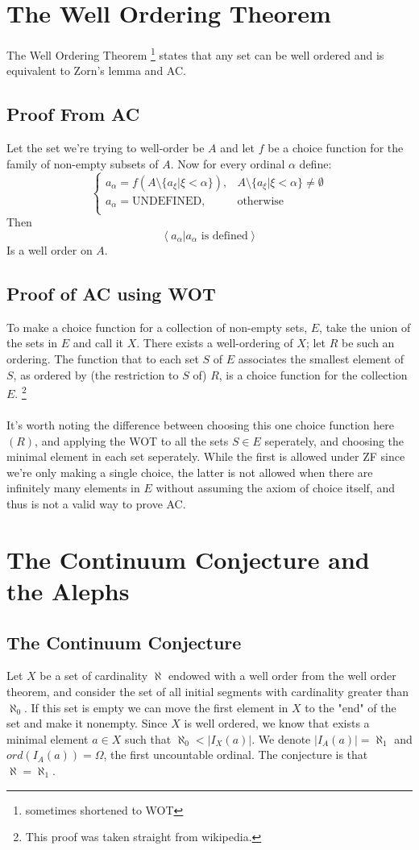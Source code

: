 \documentclass{article}
\theoremstyle{plain}
\begin{document}
\newpage
\section{The Well Ordering Theorem}
The Well Ordering Theorem
\footnote{sometimes shortened to WOT} states that any set can be well ordered 
and is equivalent to Zorn's lemma and AC.
\subsection{Proof From AC}
Let the set we're trying to well-order be $A$ and let $f$ be a choice 
function for the family of non-empty subsets of $A$. Now for every ordinal 
$\alpha$ define:
\[
	\begin{cases}
	a_\alpha = f(A\setminus\{a_\xi|\xi<\alpha\}),& A\setminus\{a_\xi|
	\xi<\alpha\}\neq\emptyset \\
	a_\alpha = \text{UNDEFINED},& \text{otherwise} \\
	\end{cases}
\]
Then
\[
	\left<a_\alpha|a_\alpha \text{ is defined}\right>
\]
Is a well order on $A$.
\subsection{Proof of AC using WOT}
To make a choice function for a collection of non-empty sets, $E$, 
take the union of the sets in $E$ and call it $X$. There exists a 
well-ordering of $X$; let $R$ be such an ordering. The function that 
to each set $S$ of $E$ associates the smallest element of $S$, 
as ordered by (the restriction to $S$ of) $R$, is a choice function 
for the collection $E$.
\footnote{This proof was taken straight from wikipedia.}\\\\
It's worth noting the difference between choosing this one choice function 
here $(R)$, and applying the WOT to all the sets $S\in E$ seperately, 
and choosing the minimal element in each set seperately. 
While the first is allowed under ZF since we're only making a single 
choice, the latter is not allowed when there are infinitely many 
elements in $E$ without assuming the axiom of choice itself, and 
thus is not a valid way to prove AC.

\newpage
	
	\section{The Continuum Conjecture and the Alephs}
	\subsection{The Continuum Conjecture}
	Let $X$ be a set of cardinality $\aleph$ endowed with a well order
	from the well order theorem, and consider the set of all 
	initial segments with cardinality greater than $\aleph_0$. 
	If this set is empty we can move the first element in $X$ to the "end" 
	of the set and make it nonempty. Since $X$ is well ordered, we know that 
	exists a minimal element $a \in X$ such that $\aleph_0 < |I_X(a)|$. 
	We denote $|I_A(a)| = \aleph_1$ and $ord(I_A(a)) = \Omega$, the first
	uncountable ordinal. The conjecture is that $\aleph=\aleph_1$.
	
\end{document}
